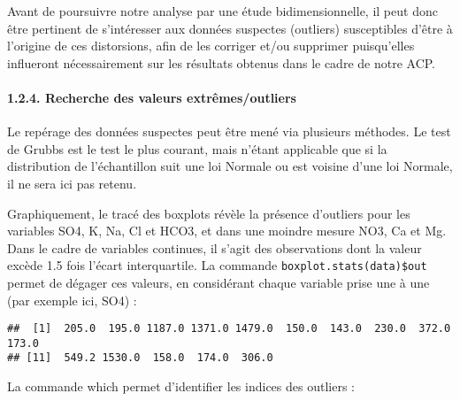 \documentclass[]{article}
\newenvironment{Shaded}{\begin{snugshade}}{\end{snugshade}}
\newcommand{\KeywordTok}[1]{\textcolor[rgb]{0.13,0.29,0.53}{\textbf{#1}}}
\newcommand{\StringTok}[1]{\textcolor[rgb]{0.31,0.60,0.02}{#1}}
\newcommand{\OperatorTok}[1]{\textcolor[rgb]{0.81,0.36,0.00}{\textbf{#1}}}
\newcommand{\NormalTok}[1]{#1}
\let\oldparagraph\paragraph
\renewcommand{\paragraph}[1]{\oldparagraph{#1}\mbox{}}
\begin{document}
Avant de poursuivre notre analyse par une étude bidimensionnelle, il
peut donc être pertinent de s'intéresser aux données suspectes
(outliers) susceptibles d'être à l'origine de ces distorsions, afin de
les corriger et/ou supprimer puisqu'elles influeront nécessairement sur
les résultats obtenus dans le cadre de notre ACP.

\hypertarget{recherche-des-valeurs-extremesoutliers}{\paragraph{1.2.4.
Recherche des valeurs
extrêmes/outliers}\label{recherche-des-valeurs-extremesoutliers}}

Le repérage des données suspectes peut être mené via plusieurs méthodes.
Le test de Grubbs est le test le plus courant, mais n'étant applicable
que si la distribution de l'échantillon suit une loi Normale ou est
voisine d'une loi Normale, il ne sera ici pas retenu.

Graphiquement, le tracé des boxplots révèle la présence d'outliers pour
les variables SO4, K, Na, Cl et HCO3, et dans une moindre mesure NO3, Ca
et Mg. Dans le cadre de variables continues, il s'agit des observations
dont la valeur excède 1.5 fois l'écart interquartile. La commande
\texttt{boxplot.stats(data)\$out} permet de dégager ces valeurs, en
considérant chaque variable prise une à une (par exemple ici, SO4) :

\begin{Shaded}
\end{Shaded}

\begin{verbatim}
##  [1]  205.0  195.0 1187.0 1371.0 1479.0  150.0  143.0  230.0  372.0  173.0
## [11]  549.2 1530.0  158.0  174.0  306.0
\end{verbatim}

La commande which permet d'identifier les indices des outliers :

\begin{Shaded}
\end{Shaded}
\end{document}
